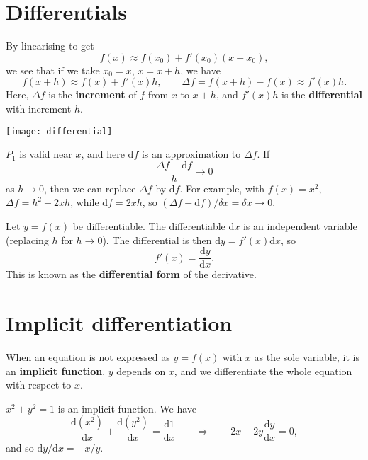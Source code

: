 \documentclass[letter-paper]{tufte-book}
\newenvironment{example}[1][Example]{\begin{trivlist}
\item[\hskip \labelsep {\bfseries #1}]}{\end{trivlist}}
\newcommand\Def[1]{\textbf{#1}}
\begin{document}

\section{Differentials}

By linearising to get
\begin{equation*}
  f(x)\approx f(x_0)+f'(x_0)(x-x_0),
\end{equation*}
we see that if we take $x_0=x$, $x=x+h$, we have
\begin{equation*}
  f(x+h)\approx f(x)+f'(x)h,\qquad
  \Delta f = f(x+h)-f(x)\approx f'(x)h.
\end{equation*}
Here, $\Delta f$ is the \Def{increment} of $f$ from $x$ to $x+h$, and
$f'(x)h$ is the \Def{differential} with increment $h$.

\begin{marginfigure}
  \texttt{[image: differential]}
\end{marginfigure}

$P_1$ is valid near $x$, and here $\mathrm{d}f$ is an approximation to $\Delta
f$. If
\begin{equation*}
  \frac{\Delta f-\mathrm{d}f}{h}\to 0
\end{equation*}
as $h\to 0$, then we can replace $\Delta f$ by $\mathrm{d}f$. For example, with
$f(x)=x^2$, $\Delta f=h^2+2x h$, while $\mathrm{d}f=2x h$, so $(\Delta
f-\mathrm{d}f)/\delta x=\delta x\to 0$.

Let $y=f(x)$ be differentiable. The differentiable $\mathrm{d}x$ is an
independent variable (replacing $h$ for $h\to0$). The differential is then
$\mathrm{d}y = f'(x)\mathrm{d}x$, so
\begin{equation*}
  f'(x)=\frac{\mathrm{d}y}{\mathrm{d}x}.
\end{equation*}
This is known as the \Def{differential form} of the derivative.


\section{Implicit differentiation}

When an equation is not expressed as $y=f(x)$ with $x$ as the sole variable, it
is an \Def{implicit function}. $y$ depends on $x$, and we differentiate
the whole equation with respect to $x$.
\begin{example}
  $x^2+y^2=1$ is an implicit function. We have
  \begin{equation*}
    \frac{\mathrm{d}(x^2)}{\mathrm{d}x}+\frac{\mathrm{d}(y^2)}{\mathrm{d}x}
    =\frac{\mathrm{d}1}{\mathrm{d}x}\qquad\Rightarrow\qquad
    2x+2y\frac{\mathrm{d}y}{\mathrm{d}x}=0,
  \end{equation*}
  and so $\mathrm{d}y/\mathrm{d}x=-x/y$.
\end{example}
\end{document}
